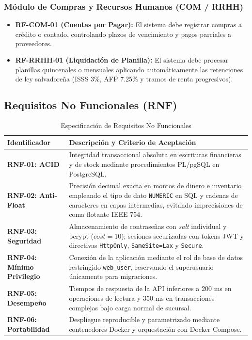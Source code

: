 \subsubsection{Módulo de Compras y Recursos Humanos (COM / RRHH)}
\begin{itemize}
    \item \textbf{RF-COM-01 (Cuentas por Pagar):} El sistema debe registrar compras a crédito o contado, controlando plazos de vencimiento y pagos parciales a proveedores.
    \item \textbf{RF-RRHH-01 (Liquidación de Planilla):} El sistema debe procesar planillas quincenales o mensuales aplicando automáticamente las retenciones de ley salvadoreña (ISSS 3\%, AFP 7.25\% y tramos de renta progresivos).
\end{itemize}

\subsection{Requisitos No Funcionales (RNF)}

\begin{table}[htbp]
\caption{Especificación de Requisitos No Funcionales}
\label{tab:rnf}
\begin{tabularx}{\columnwidth}{lX}
\toprule
\textbf{Identificador} & \textbf{Descripción y Criterio de Aceptación} \\
\midrule
\textbf{RNF-01: ACID} & Integridad transaccional absoluta en escrituras financieras y de stock mediante procedimientos PL/pgSQL en PostgreSQL. \\
\textbf{RNF-02: Anti-Float} & Precisión decimal exacta en montos de dinero e inventario empleando el tipo de dato \texttt{NUMERIC} en SQL y cadenas de caracteres en capas intermedias, evitando imprecisiones de coma flotante IEEE 754. \\
\textbf{RNF-03: Seguridad} & Almacenamiento de contraseñas con \textit{salt} individual y bcrypt ($cost=10$); sesiones securizadas con tokens JWT y directivas \texttt{HttpOnly}, \texttt{SameSite=Lax} y \texttt{Secure}. \\
\textbf{RNF-04: Mínimo Privilegio} & Conexión de la aplicación mediante el rol de base de datos restringido \texttt{web\_user}, reservando el superusuario únicamente para migraciones. \\
\textbf{RNF-05: Desempeño} & Tiempos de respuesta de la API inferiores a 200 ms en operaciones de lectura y 350 ms en transacciones complejas bajo carga normal de sucursal. \\
\textbf{RNF-06: Portabilidad} & Despliegue reproducible y parametrizado mediante contenedores Docker y orquestación con Docker Compose. \\
\bottomrule
\end{tabularx}
\end{table}

